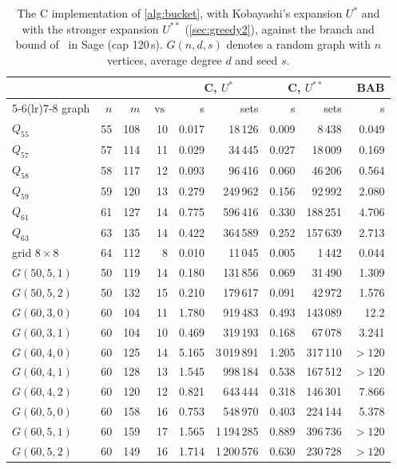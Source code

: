 \documentclass[11pt]{article}
\theoremstyle{definition}
\newcommand{\vs}{\operatorname{vs}}
\begin{document}
\begin{table}[ht]
\centering
\small
\begin{tabular}{lrrrrrrrr}
\toprule
& & & & \multicolumn{2}{c}{C, $U^*$} & \multicolumn{2}{c}{C, $U^{**}$} & BAB\\
\cmidrule(lr){5-6}\cmidrule(lr){7-8}
graph & $n$ & $m$ & $\vs$ & s & sets & s & sets & s\\
\midrule
$Q_{55}$ & 55 & 108 & 10 & 0.017 & 18\,126 & 0.009 & 8\,438 & 0.049\\
$Q_{57}$ & 57 & 114 & 11 & 0.029 & 34\,445 & 0.027 & 18\,009 & 0.169\\
$Q_{58}$ & 58 & 117 & 12 & 0.093 & 96\,416 & 0.060 & 46\,206 & 0.564\\
$Q_{59}$ & 59 & 120 & 13 & 0.279 & 249\,962 & 0.156 & 92\,992 & 2.080\\
$Q_{61}$ & 61 & 127 & 14 & 0.775 & 596\,416 & 0.330 & 188\,251 & 4.706\\
$Q_{63}$ & 63 & 135 & 14 & 0.422 & 364\,589 & 0.252 & 157\,639 & 2.713\\
grid $8\times8$ & 64 & 112 & 8 & 0.010 & 11\,045 & 0.005 & 1\,442 & 0.044\\
$G(50,5,1)$ & 50 & 119 & 14 & 0.180 & 131\,856 & 0.069 & 31\,490 & 1.309\\
$G(50,5,2)$ & 50 & 132 & 15 & 0.210 & 179\,617 & 0.091 & 42\,972 & 1.576\\
$G(60,3,0)$ & 60 & 104 & 11 & 1.780 & 919\,483 & 0.493 & 143\,089 & 12.2\\
$G(60,3,1)$ & 60 & 104 & 10 & 0.469 & 319\,193 & 0.168 & 67\,078 & 3.241\\
$G(60,4,0)$ & 60 & 125 & 14 & 5.165 & 3\,019\,891 & 1.205 & 317\,110 & $>120$\\
$G(60,4,1)$ & 60 & 128 & 13 & 1.545 & 998\,184 & 0.538 & 167\,512 & $>120$\\
$G(60,4,2)$ & 60 & 120 & 12 & 0.821 & 643\,444 & 0.318 & 146\,301 & 7.866\\
$G(60,5,0)$ & 60 & 158 & 16 & 0.753 & 548\,970 & 0.403 & 224\,144 & 5.378\\
$G(60,5,1)$ & 60 & 159 & 17 & 1.565 & 1\,194\,285 & 0.889 & 396\,736 & $>120$\\
$G(60,5,2)$ & 60 & 149 & 16 & 1.714 & 1\,200\,576 & 0.630 & 230\,728 & $>120$\\
\bottomrule
\end{tabular}
\caption{The C implementation of \cref{alg:bucket}, with Kobayashi's
expansion $U^*$ and with the stronger expansion $U^{**}$
(\cref{sec:greedy2}), against the branch and bound of~\cite{CMN14} in Sage
(cap 120\,s). $G(n,d,s)$ denotes a random graph with $n$ vertices,
average degree $d$ and seed $s$.}\label{tab:bab}
\end{table}
\end{document}
